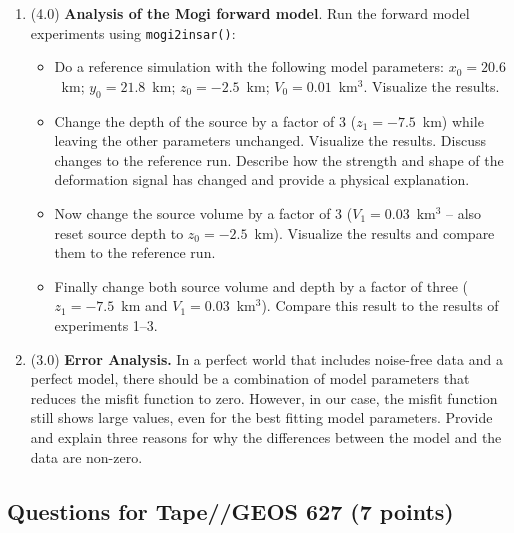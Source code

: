 \documentclass[11pt,titlepage,fleqn]{article}
\begin{document}
\begin{enumerate}
\item (4.0) {\bf Analysis of the Mogi forward model}. Run the forward model experiments using \verb+mogi2insar()+:
\begin{itemize}
\item Do a reference simulation with the following model parameters: $x_0 = 20.6$~km; $y_0 = 21.8$~km; $z_0 = -2.5$~km; $V_0 = 0.01$~km$^3$. Visualize the results.
\item Change the depth of the source by a factor of 3 ($z_1 = -7.5$~km) while leaving the other parameters unchanged. Visualize the results. Discuss changes to the reference run. Describe how the strength and shape of the deformation signal has changed and provide a physical explanation.
\item Now change the source volume by a factor of 3 ($V_1 = 0.03$~km$^3$ -- also reset source depth to $z_0 = -2.5$~km). Visualize the results and compare them to the reference run.
\item Finally change both source volume and depth by a factor of three ($z_1 = -7.5$~km and $V_1 = 0.03$~km$^3$). Compare this result to the results of experiments 1--3.
\end{itemize}

\item (3.0) {\bf Error Analysis.} In a perfect world that includes noise-free data and a perfect model, there should be a combination of model parameters that reduces the misfit function to zero. However, in our case, the misfit function still shows large values, even for the best fitting model parameters. Provide and explain three reasons for why the differences between the model and the data are non-zero.
\end{enumerate}


\pagebreak
\subsection*{Questions for Tape//GEOS 627 (7 points)}
\end{document}
